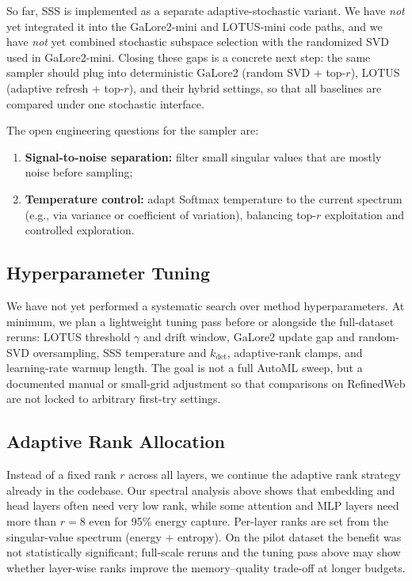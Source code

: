 \documentclass[conference]{IEEEtran}
\begin{document}
So far, SSS is implemented as a separate adaptive-stochastic variant. We have \emph{not} yet integrated it into the GaLore2-mini and LOTUS-mini code paths, and we have \emph{not} yet combined stochastic subspace selection with the randomized SVD used in GaLore2-mini. Closing these gaps is a concrete next step: the same sampler should plug into deterministic GaLore2 (random SVD + top-$r$), LOTUS (adaptive refresh + top-$r$), and their hybrid settings, so that all baselines are compared under one stochastic interface.

The open engineering questions for the sampler are:
\begin{enumerate}
    \item \textbf{Signal-to-noise separation:} filter small singular values that are mostly noise before sampling;
    \item \textbf{Temperature control:} adapt Softmax temperature to the current spectrum (e.g., via variance or coefficient of variation), balancing top-$r$ exploitation and controlled exploration.
\end{enumerate}

\subsection{Hyperparameter Tuning}
We have not yet performed a systematic search over method hyperparameters. At minimum, we plan a lightweight tuning pass before or alongside the full-dataset reruns: LOTUS threshold $\gamma$ and drift window, GaLore2 update gap and random-SVD oversampling, SSS temperature and $k_{\text{det}}$, adaptive-rank clamps, and learning-rate warmup length. The goal is not a full AutoML sweep, but a documented manual or small-grid adjustment so that comparisons on RefinedWeb are not locked to arbitrary first-try settings.

\subsection{Adaptive Rank Allocation}
Instead of a fixed rank $r$ across all layers, we continue the adaptive rank strategy already in the codebase. Our spectral analysis above shows that embedding and head layers often need very low rank, while some attention and MLP layers need more than $r=8$ even for 95\% energy capture. Per-layer ranks are set from the singular-value spectrum (energy + entropy). On the pilot dataset the benefit was not statistically significant; full-scale reruns and the tuning pass above may show whether layer-wise ranks improve the memory--quality trade-off at longer budgets.
\end{document}
